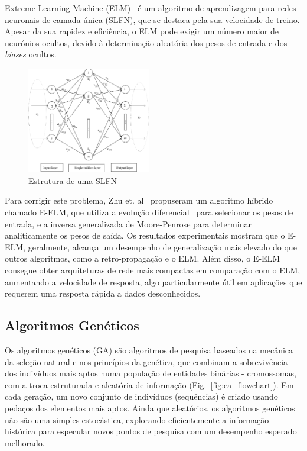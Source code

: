 \documentclass[conference]{IEEEtran}
\begin{document}
Extreme Learning Machine (ELM)~\cite{Guang-BinHuang2004ExtremeNetworks} é um algoritmo de aprendizagem para redes neuronais de camada única (SLFN), que se destaca pela sua velocidade de treino. Apesar da sua rapidez e eficiência, o ELM pode exigir um número maior de neurónios ocultos, devido à determinação aleatória dos pesos de entrada e dos \textit{biases} ocultos.

\begin{figure}[htbp]
    \centering
    \includegraphics[width=0.48\textwidth]{imagens/slfn.png}
    \caption{Estrutura de uma SLFN~\cite{Erdem2020IntroductionMachines}}
    \label{fig:slfn}
\end{figure}

Para corrigir este problema, Zhu et. al~\cite{Zhu2005EvolutionaryMachine} propuseram um algoritmo híbrido chamado E-ELM, que utiliza a evolução diferencial~\cite{Storn1997DifferentialSpaces} para selecionar os pesos de entrada, e a inversa generalizada de Moore-Penrose para determinar analiticamente os pesos de saída. Os resultados experimentais mostram que o E-ELM, geralmente, alcança um desempenho de generalização mais elevado do que outros algoritmos, como a retro-propagação e o ELM. Além disso, o E-ELM consegue obter arquiteturas de rede mais compactas em comparação com o ELM, aumentando a velocidade de resposta, algo particularmente útil em aplicações que requerem uma resposta rápida a dados desconhecidos.

\subsection{Algoritmos Genéticos}

Os algoritmos genéticos (GA) são algoritmos de pesquisa baseados na mecânica da seleção natural e nos princípios da genética, que combinam a sobrevivência dos indivíduos mais aptos numa população de entidades binárias - cromossomas, com a troca estruturada e aleatória de informação (Fig.~\ref{fig:ea_flowchart}). Em cada geração, um novo conjunto de indivíduos (sequências) é criado usando pedaços dos elementos mais aptos. Ainda que aleatórios, os  algoritmos genéticos não são uma simples  estocástica, explorando eficientemente a informação histórica para especular novos pontos de pesquisa com um desempenho esperado melhorado.~\cite{Goldberg1989GeneticLearning}
\end{document}
